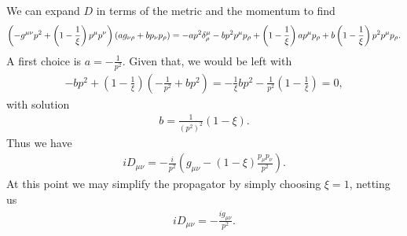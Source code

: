 We can expand $D$ in terms of the metric and the momentum to find
\begin{align*}
	\left(-g^{\mu\nu}p^{2} + \left(1 - \frac{1}{\xi}\right)p^{\mu}p^{\nu}\right)(ag_{\nu\rho} + bp_{\nu}p_{\rho}) = -ap^{2}\kdelta{\mu}{\rho} - bp^{2}p^{\mu}p_{\rho} + \left(1 - \frac{1}{\xi}\right)ap^{\mu}p_{\rho} + b\left(1 - \frac{1}{\xi}\right)p^{2}p^{\mu}p_{\rho}.
\end{align*}
A first choice is $a = -\frac{1}{p^{2}}$. Given that, we would be left with
\begin{align*}
	-bp^{2} + \left(1 - \frac{1}{\xi}\right)\left(-\frac{1}{p^{2}} + bp^{2}\right) = -\frac{1}{\xi}bp^{2} - \frac{1}{p^{2}}\left(1 - \frac{1}{\xi}\right) = 0,
\end{align*}
with solution
\begin{align*}
	b = \frac{1}{(p^{2})^{2}}(1 - \xi).
\end{align*}
Thus we have
\begin{align*}
	iD_{\mu\nu} = -\frac{i}{p^{2}}\left(g_{\mu\nu} - (1 - \xi)\frac{p_{\mu}p_{\nu}}{p^{2}}\right).
\end{align*}
At this point we may simplify the propagator by simply choosing $\xi = 1$, netting us
\begin{align*}
	iD_{\mu\nu} = -\frac{ig_{\mu\nu}}{p^{2}}.
\end{align*}